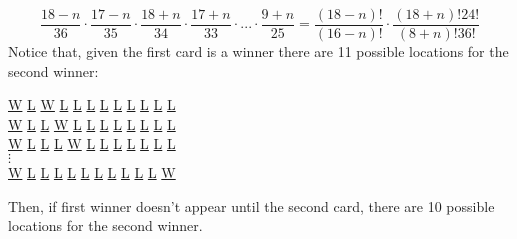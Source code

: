 \documentclass[11pt]{article}
\begin{document}
\begin {equation}
\frac{18-n}{36}\cdot \frac{17-n}{35}\cdot \frac{18+n}{34} \cdot \frac{17+n}{33}\cdot ...\cdot \frac {9+n}{25}=\frac{(18-n)!}{(16-n)!}\cdot \frac{(18+n)!24!}{(8+n)!36!}
\end{equation}
Notice that, given the first card is a winner there are 11 possible locations for the second winner:
\begin {center}
  \underline{W} \underline{L} \underline{W} \underline{L} \underline{L} \underline{L} \underline{L} \underline{L} \underline{L} \underline{L} \underline{L} \underline{L}\\
  \underline{W} \underline{L} \underline{L} \underline{W} \underline{L} \underline{L} \underline{L} \underline{L} \underline{L} \underline{L} \underline{L} \underline{L}\\
  \underline{W} \underline{L} \underline{L} \underline{L} \underline{W} \underline{L} \underline{L} \underline{L} \underline{L} \underline{L} \underline{L} \underline{L}\\
 $\vdots$ \\
   \underline{W} \underline{L} \underline{L} \underline{L} \underline{L} \underline{L} \underline{L} \underline{L} \underline{L} \underline{L} \underline{L} \underline{W}\\
\end {center}
Then, if first winner doesn't appear until the second card, there are 10 possible locations for the second winner. 
\end{document}
